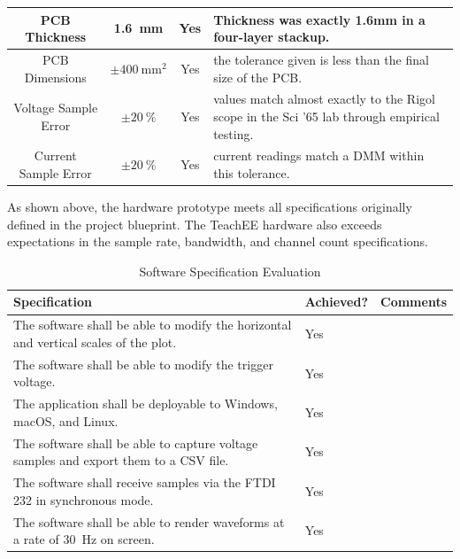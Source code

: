 \documentclass[letterpaper,11pt]{article}
\begin{document}
\begin{table}[H]
\begin{tabularx}{\textwidth}{c|c|c|p{5cm}}
        \hline
        PCB Thickness& \SI{1.6}{\milli\metre} & Yes & Thickness was exactly 1.6mm in a four-layer stackup. \\
        \hline
        PCB Dimensions& $\pm \SI{400}{\milli\metre\squared}$ & Yes & the tolerance given is less than the final size of the PCB.\\
        \hline
        Voltage Sample Error & $\pm \SI{20}{\percent}$ & Yes & values match almost exactly to the Rigol scope in the Sci '65 lab through empirical testing.\\
        \hline
        Current Sample Error & $\pm \SI{20}{\percent}$ & Yes & current readings match a DMM within this tolerance.\\
        \hline
    \end{tabularx} 
\label{tab:hw-spec-eval}
\end{table}

As shown above, the hardware prototype meets all specifications originally
defined in the project blueprint. The TeachEE hardware also exceeds expectations
in the sample rate, bandwidth, and channel count specifications.

\begin{table}[H]
  \caption{Software Specification Evaluation}
  \begin{tabularx}{\textwidth}{l|l|p{5cm}}
    Specification & Achieved? & Comments\\
    \hline
    The software shall be able to modify the horizontal and vertical scales of the plot. & Yes & \\
    The software shall be able to modify the trigger voltage. & Yes & \\
    The application shall be deployable to Windows, macOS, and Linux. & Yes & \\
    \hline
    The software shall be able to capture voltage samples and export them to a CSV file. & Yes & \\
    The software shall receive samples via the FTDI 232 in synchronous mode. & Yes & \\
    \hline
    The software shall be able to render waveforms at a rate of \SI{30}{\hertz} on screen. & Yes & \\
    \hline
  \end{tabularx} 
  \label{tab:sw-spec-eval}
\end{table}
\end{document}
